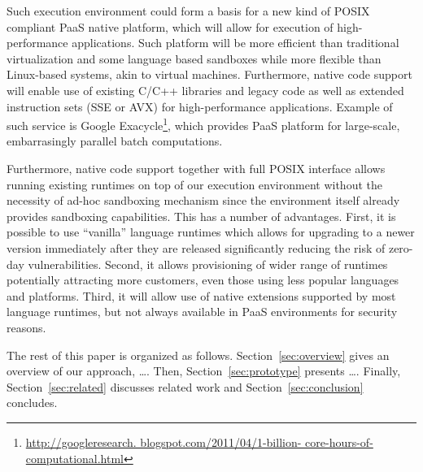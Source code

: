 Such execution environment could form a basis for a new kind of
POSIX compliant PaaS native platform, which will allow for execution of
high-performance applications. Such platform will be more efficient than
traditional virtualization and some language based sandboxes while more
flexible than Linux-based systems, akin to virtual machines.
Furthermore, native code support will enable use of existing C/C++
libraries and legacy code as well as extended instruction sets (\eg SSE
or AVX) for high-performance applications. Example of such service is
Google Exacycle\footnote{\url{http://googleresearch.
blogspot.com/2011/04/1-billion- core-hours-of-computational.html}},
which provides PaaS platform for large-scale, embarrasingly parallel
batch computations.

Furthermore, native code support together with full POSIX interface
allows running existing runtimes on top of our execution environment
without the necessity of ad-hoc sandboxing mechanism since the
environment itself already provides sandboxing capabilities. This has a
number of advantages.  First, it is possible to use ``vanilla'' language
runtimes which allows for upgrading to a newer version immediately after
they are released significantly reducing the risk of zero-day
vulnerabilities. Second, it allows provisioning of wider range of
runtimes potentially attracting more customers, even those using less
popular languages and platforms.  Third, it will allow use of native
extensions supported by most language runtimes, but not always available in
PaaS environments for security reasons.




The rest of this paper is organized as follows.
Section~\ref{sec:overview} gives an overview of our approach, \ldots.
Then, Section~\ref{sec:prototype} presents \ldots. Finally,
Section~\ref{sec:related} discusses related work and
Section~\ref{sec:conclusion} concludes.


